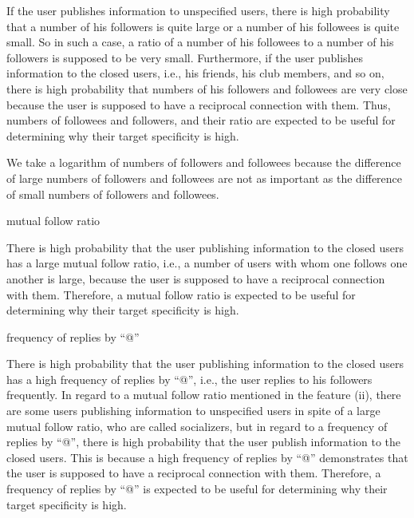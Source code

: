If the user publishes information to unspecified users, there is high
probability that a number of his followers is quite large or a
number of his followees is quite small.  So in such a case, a ratio
of a number of his followees to a number of his followers is
supposed to be very small.  Furthermore, if the user publishes
information to the closed users, i.e., his friends, his club
members, and so on, there is high probability that numbers of his
followers and followees are very close because the user is supposed to
have a reciprocal connection with them.  Thus, numbers of followees and
followers, and their ratio are expected to be useful for determining why
their target specificity is high.

We take a logarithm of numbers of followers and followees because the
difference of large numbers of followers and followees are not as
important as the difference of small numbers of followers and followees.

\begin{description}
\bf {\item[(ii)] mutual follow ratio}
\end{description}

There is high probability that the user publishing information to the
closed users has a large mutual follow ratio, i.e., a number of users
with whom one follows one another is large, because the user is supposed
to have a reciprocal connection with them.  Therefore, a mutual follow
ratio is expected to be useful for determining why their target
specificity is high.

\begin{description}
\bf {\item[(iii)] frequency of replies by ``@''}
\end{description}

There is high probability that the user publishing information to the
closed users has a high frequency of replies by ``@'', i.e., the user
replies to his followers frequently. In regard to a mutual follow
ratio mentioned in the feature (ii), there are some users publishing information to
unspecified users in spite of a large mutual follow ratio, who are
called socializers, but in regard to a frequency of replies by ``@'',
there is high probability that the
user publish information to the closed users.  This is because a high
frequency of replies by ``@'' demonstrates that the user is supposed to
have a reciprocal connection with them.  Therefore, a frequency of
replies by ``@'' is expected to be useful for determining why their
target specificity is high.

